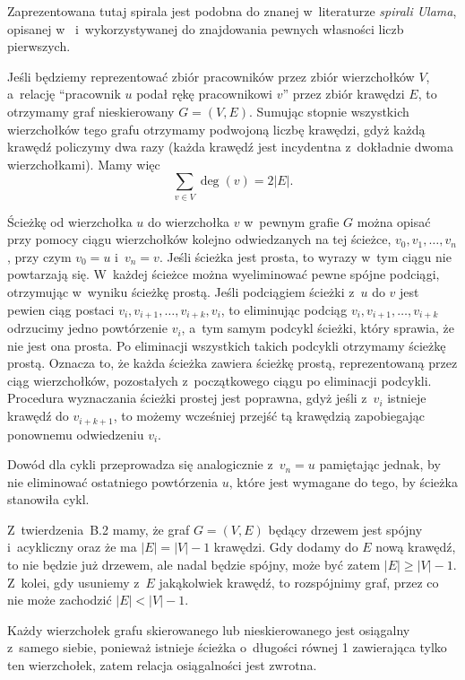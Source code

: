 Zaprezentowana tutaj spirala jest podobna do znanej w~literaturze \emph{spirali Ulama}, opisanej w~\cite{ulamspiral} i~wykorzystywanej do znajdowania pewnych własności liczb pierwszych.


\exercise %
Jeśli będziemy reprezentować zbiór pracowników przez zbiór wierzchołków $V$, a~relację ``pracownik $u$ podał rękę pracownikowi $v$'' przez zbiór krawędzi $E$, to otrzymamy graf nieskierowany $G=(V,E)$. Sumując stopnie wszystkich wierzchołków tego grafu otrzymamy podwojoną liczbę krawędzi, gdyż każdą krawędź policzymy dwa razy (każda krawędź jest incydentna z~dokładnie dwoma wierzchołkami). Mamy więc
\[
	\sum_{v\in V}\deg(v) = 2|E|.
\]

\exercise %
Ścieżkę od wierzchołka $u$ do wierzchołka $v$ w~pewnym grafie $G$ można opisać przy pomocy ciągu wierzchołków kolejno odwiedzanych na tej ścieżce, $v_0,v_1,\dots,v_n$, przy czym $v_0=u$ i~$v_n=v$. Jeśli ścieżka jest prosta, to wyrazy w~tym ciągu nie powtarzają się. W~każdej ścieżce można wyeliminować pewne spójne podciągi, otrzymując w~wyniku ścieżkę prostą. Jeśli podciągiem ścieżki z~$u$ do $v$ jest pewien ciąg postaci $v_i,v_{i+1},\dots,v_{i+k},v_i$, to eliminując podciąg $v_i,v_{i+1},\dots,v_{i+k}$ odrzucimy jedno powtórzenie $v_i$, a~tym samym podcykl ścieżki, który sprawia, że nie jest ona prosta. Po eliminacji wszystkich takich podcykli otrzymamy ścieżkę prostą. Oznacza to, że każda ścieżka zawiera ścieżkę prostą, reprezentowaną przez ciąg wierzchołków, pozostałych z~początkowego ciągu po eliminacji podcykli. Procedura wyznaczania ścieżki prostej jest poprawna, gdyż jeśli z~$v_i$ istnieje krawędź do $v_{i+k+1}$, to możemy wcześniej przejść tą krawędzią zapobiegając ponownemu odwiedzeniu $v_i$.

Dowód dla cykli przeprowadza się analogicznie z~$v_n=u$ pamiętając jednak, by nie eliminować ostatniego powtórzenia $u$, które jest wymagane do tego, by ścieżka stanowiła cykl.

\exercise %
Z~twierdzenia~B.2 mamy, że graf $G=(V,E)$ będący drzewem jest spójny i~acykliczny oraz że ma $|E|=|V|-1$ krawędzi. Gdy dodamy do $E$ nową krawędź, to nie będzie już drzewem, ale nadal będzie spójny, może być zatem $|E|\ge|V|-1$. Z~kolei, gdy usuniemy z~$E$ jakąkolwiek krawędź, to rozspójnimy graf, przez co nie może zachodzić $|E|<|V|-1$.

\exercise %
Każdy wierzchołek grafu skierowanego lub nieskierowanego jest osiągalny z~samego siebie, ponieważ istnieje ścieżka o~długości równej 1 zawierająca tylko ten wierzchołek, zatem relacja osiągalności jest zwrotna.

